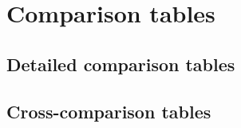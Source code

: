 \chapter{Comparison tables}\label{comparison_tables}

\vspace*{\fill}
\centering\section{Detailed comparison tables}\label{detailed_comparison_tables_section}
\vspace*{\fill}

\clearpage



\clearpage

%
%
% 
%

\vspace*{\fill}
\centering\section{Cross-comparison tables}\label{cross-comparison_tables_section}
\vspace*{\fill}

\clearpage


